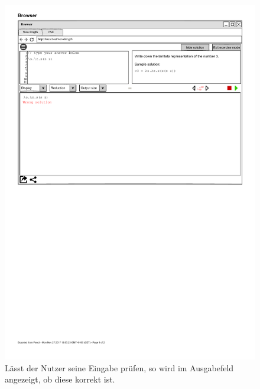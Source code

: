 \documentclass[parskip=full,11pt,twoside]{scrartcl}
\begin{document}
\begin{figure}[H]
	\centering
	\includegraphics[width=\textwidth]{img/exerciseModeSolutionCheck}
	\caption{\label{fig:solutionCheck}Lässt der Nutzer seine Eingabe prüfen, so wird im Ausgabefeld angezeigt, ob diese korrekt ist.}
\end{figure}
\end{document}
